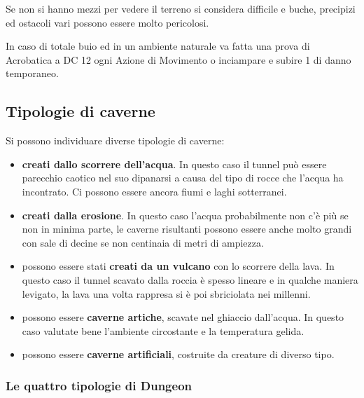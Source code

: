 \begin{multicols}{2}
Se non si hanno mezzi per vedere il terreno si considera difficile e buche, precipizi ed ostacoli vari possono essere molto pericolosi.

In caso di totale buio ed in un ambiente naturale va fatta una prova di Acrobatica a DC 12 ogni Azione di Movimento o inciampare e subire 1 di danno temporaneo.

\subsection{Tipologie di caverne}

Si possono individuare diverse tipologie di caverne:

\begin{itemize}[leftmargin=*] \setlength{\itemsep}{0pt}

\item \textbf{creati dallo scorrere dell'acqua}. In questo caso il tunnel può essere parecchio caotico nel suo dipanarsi a causa del tipo di rocce che l'acqua ha incontrato. Ci possono essere ancora fiumi e laghi sotterranei.

\item \textbf{creati dalla erosione}. In questo caso l'acqua probabilmente non c'è più se non in minima parte, le caverne risultanti possono essere anche molto grandi con sale di decine se non centinaia di metri di ampiezza.

\item possono essere stati \textbf{creati da un vulcano} con lo scorrere della lava. In questo caso il tunnel scavato dalla roccia è spesso lineare e in qualche maniera levigato, la lava una volta rappresa si è poi sbriciolata nei millenni.

\item possono essere \textbf{caverne artiche}, scavate nel ghiaccio dall'acqua. In questo caso valutate bene l'ambiente circostante e la temperatura gelida.

\item possono essere \textbf{caverne artificiali}, costruite da creature di diverso tipo.

\end{itemize}

\subsubsection{Le quattro tipologie di Dungeon}


\end{multicols}

